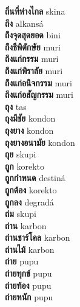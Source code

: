 \textbf{ ถิ่นที่ห่างไกล  } skina \\
\textbf{ ถึง  } alkansá \\
\textbf{ ถึงจุดสุดยอด  } bini \\
\textbf{ ถึงชีพิตักษัย  } muri \\
\textbf{ ถึงแก่กรรม  } muri \\
\textbf{ ถึงแก่พิราลัย  } muri \\
\textbf{ ถึงแก่อนิจกรรม  } muri \\
\textbf{ ถึงแก่อสัญกรรม  } muri \\
\textbf{ ถุง  } tas \\
\textbf{ ถุงมีชัย  } kondon \\
\textbf{ ถุงยาง  } kondon \\
\textbf{ ถุงยางอนามัย  } kondon \\
\textbf{ ถุย  } skupi \\
\textbf{ ถูก  } korekto \\
\textbf{ ถูกกำหนด  } destiná \\
\textbf{ ถูกต้อง  } korekto \\
\textbf{ ถูกลง  } degradá \\
\textbf{ ถ่ม  } skupi \\
\textbf{ ถ่าน  } karbon \\
\textbf{ ถ่านชาร์โคล  } karbon \\
\textbf{ ถ่านไม้  } karbon \\
\textbf{ ถ่าย  } pupu \\
\textbf{ ถ่ายทุกข์  } pupu \\
\textbf{ ถ่ายท้อง  } pupu \\
\textbf{ ถ่ายหนัก  } pupu \\

